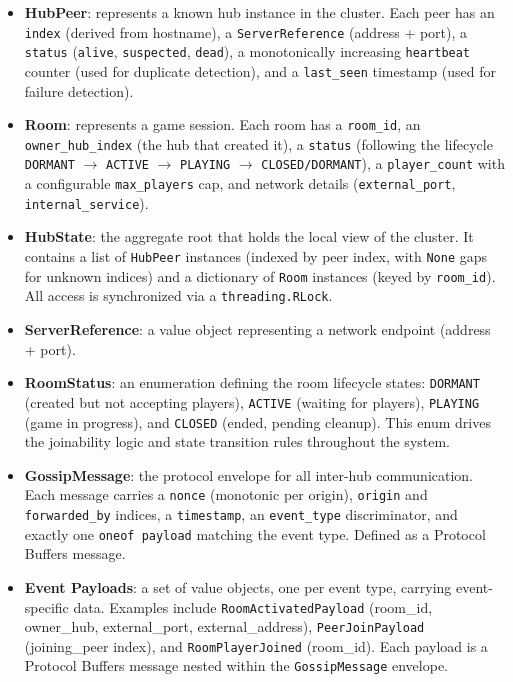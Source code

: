\begin{itemize}
  \item \textbf{HubPeer}: represents a known hub instance in the cluster. Each peer has an \texttt{index} (derived from hostname), a \texttt{ServerReference} (address + port), a \texttt{status} (\texttt{alive}, \texttt{suspected}, \texttt{dead}), a monotonically increasing \texttt{heartbeat} counter (used for duplicate detection), and a \texttt{last\_seen} timestamp (used for failure detection).
  \item \textbf{Room}: represents a game session. Each room has a \texttt{room\_id}, an \texttt{owner\_hub\_index} (the hub that created it), a \texttt{status} (following the lifecycle \texttt{DORMANT} $\rightarrow$ \texttt{ACTIVE} $\rightarrow$ \texttt{PLAYING} $\rightarrow$ \texttt{CLOSED/DORMANT}), a \texttt{player\_count} with a configurable \texttt{max\_players} cap, and network details (\texttt{external\_port}, \texttt{internal\_service}).
  \item \textbf{HubState}: the aggregate root that holds the local view of the cluster. It contains a list of \texttt{HubPeer} instances (indexed by peer index, with \texttt{None} gaps for unknown indices) and a dictionary of \texttt{Room} instances (keyed by \texttt{room\_id}). All access is synchronized via a \texttt{threading.RLock}.
  \item \textbf{ServerReference}: a value object representing a network endpoint (address + port).
  \item \textbf{RoomStatus}: an enumeration defining the room lifecycle states: \texttt{DORMANT} (created but not accepting players), \texttt{ACTIVE} (waiting for players), \texttt{PLAYING} (game in progress), and \texttt{CLOSED} (ended, pending cleanup). This enum drives the joinability logic and state transition rules throughout the system.
  \item \textbf{GossipMessage}: the protocol envelope for all inter-hub communication. Each message carries a \texttt{nonce} (monotonic per origin), \texttt{origin} and \texttt{forwarded\_by} indices, a \texttt{timestamp}, an \texttt{event\_type} discriminator, and exactly one \texttt{oneof payload} matching the event type. Defined as a Protocol Buffers message.
  \item \textbf{Event Payloads}: a set of value objects, one per event type, carrying event-specific data. Examples include \texttt{RoomActivatedPayload} (room\_id, owner\_hub, external\_port, external\_address), \texttt{PeerJoinPayload} (joining\_peer index), and \texttt{RoomPlayerJoined} (room\_id). Each payload is a Protocol Buffers message nested within the \texttt{GossipMessage} envelope.
\end{itemize}


